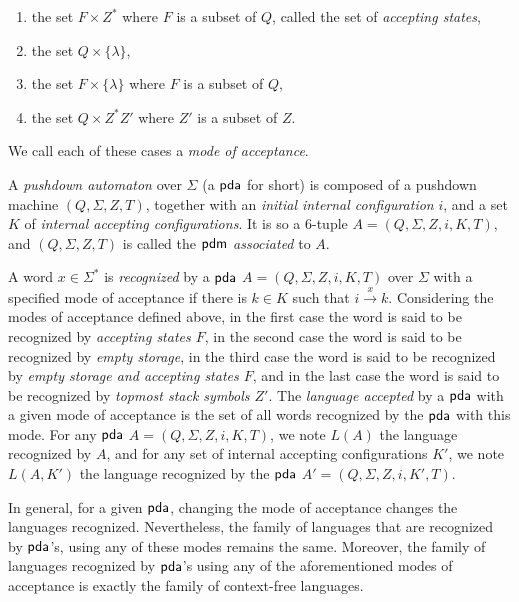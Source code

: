 \begin{enumerate}
\item the set $F \times Z^*$ where $F$ is a subset of $Q$, called the set of \emph{accepting states},
\item the set $Q \times \{\lambda\}$,
\item the set $F \times \{\lambda\}$ where $F$ is a subset of $Q$,
\item the set $Q \times Z^* Z'$ where $Z'$ is a subset of $Z$.
\end{enumerate}

We call each of these cases a \emph{mode of acceptance}.

A \emph{pushdown automaton} over $\Sigma$ (a \index{$\pda$}$\pda$ for short) is composed of a pushdown machine $(Q, \Sigma, Z, T)$, together with an   \emph{initial internal configuration} $i$, and a set $K$ of \emph{internal accepting configurations}. It is so a $6$-tuple $A = (Q, \Sigma, Z, i, K, T)$, and $(Q, \Sigma, Z, T)$ is called the \index{$\pdm$}\emph{$\pdm$ associated} to $A$.

A word $x \in \Sigma^*$ is \emph{recognized} by a \index{$\pda$}$\pda$ $A = (Q, \Sigma, Z, i, K ,T)$ over $\Sigma$ with a specified  mode of acceptance if there is $k \in K$ such that $i \xrightarrow{x} k$. Considering  the modes of acceptance defined above, in the first case the word is said to be recognized by  \emph{accepting states $F$}, in the second case the word is said to be recognized by \emph{empty storage}, in the third case the word is said to be recognized by \emph{empty storage and accepting states $F$}, and in the last case the word is said to be recognized by \emph{topmost stack symbols $Z'$}. The \emph{language accepted} by a \index{$\pda$}$\pda$ with a given mode of acceptance is the set of all words recognized by the \index{$\pda$}$\pda$ with this mode. For any $\pda$ $A = (Q, \Sigma, Z, i, K, T)$, we note $L(A)$ the language recognized by $A$, and for any set of internal accepting configurations $K'$, we note $L(A, K')$ the language recognized by the \index{$\pda$}$\pda$ $A' = (Q, \Sigma, Z, i, K', T)$.

In general, for a given \index{$\pda$}$\pda$, changing the mode of acceptance changes the languages recognized. Nevertheless, the family of languages that are recognized by \index{$\pda$}$\pda$'s, using any of these modes remains the same. 
Moreover, the family of languages recognized by \index{$\pda$}$\pda$'s using any of the aforementioned modes of acceptance is exactly the family of context-free languages.

